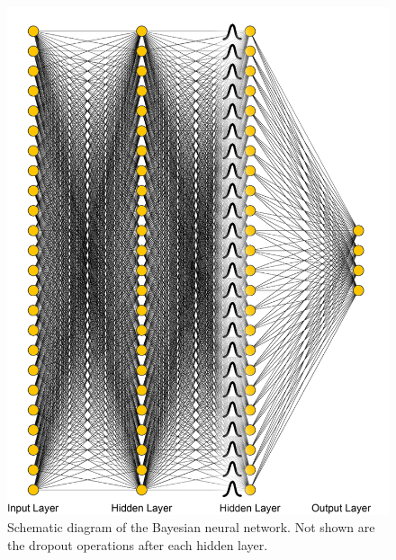\begin{figure}[!htp]
\begin{minipage}[b][][b]{.35\linewidth}
\end{minipage}
\hfill
\begin{minipage}[b][][b]{.61\linewidth}
    \includegraphics[width=\linewidth]{templates/images/Figure-BNN.png}
    \caption[Bayesian neural network structural schematic]{Schematic diagram of the Bayesian neural network. Not shown are the dropout operations after each hidden layer.}
    \label{fig:bnn_dot_structure}
\end{minipage}
\end{figure}

